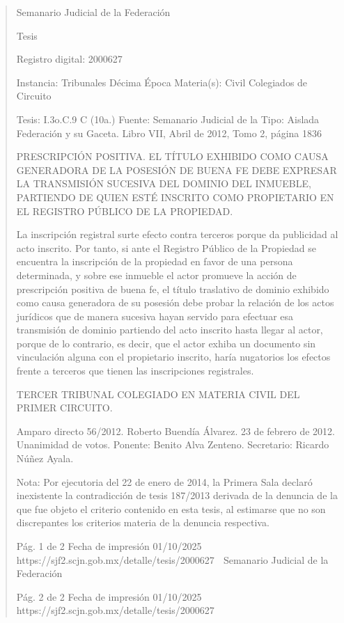 \documentclass[11pt,a4paper]{article}
\begin{document}
\begin{quote}
                                                   Semanario Judicial de la Federación

                                                 Tesis

 Registro digital: 2000627

 Instancia: Tribunales              Décima Época                           Materia(s): Civil
 Colegiados de Circuito

 Tesis: I.3o.C.9 C (10a.)           Fuente: Semanario Judicial de la       Tipo: Aislada
                                    Federación y su Gaceta.
                                    Libro VII, Abril de 2012, Tomo 2,
                                    página 1836


PRESCRIPCIÓN POSITIVA. EL TÍTULO EXHIBIDO COMO CAUSA GENERADORA DE LA
POSESIÓN DE BUENA FE DEBE EXPRESAR LA TRANSMISIÓN SUCESIVA DEL DOMINIO DEL
INMUEBLE, PARTIENDO DE QUIEN ESTÉ INSCRITO COMO PROPIETARIO EN EL REGISTRO
PÚBLICO DE LA PROPIEDAD.


La inscripción registral surte efecto contra terceros porque da publicidad al acto inscrito. Por tanto, si
ante el Registro Público de la Propiedad se encuentra la inscripción de la propiedad en favor de una
persona determinada, y sobre ese inmueble el actor promueve la acción de prescripción positiva de
buena fe, el título traslativo de dominio exhibido como causa generadora de su posesión debe
probar la relación de los actos jurídicos que de manera sucesiva hayan servido para efectuar esa
transmisión de dominio partiendo del acto inscrito hasta llegar al actor, porque de lo contrario, es
decir, que el actor exhiba un documento sin vinculación alguna con el propietario inscrito, haría
nugatorios los efectos frente a terceros que tienen las inscripciones registrales.

TERCER TRIBUNAL COLEGIADO EN MATERIA CIVIL DEL PRIMER CIRCUITO.


Amparo directo 56/2012. Roberto Buendía Álvarez. 23 de febrero de 2012. Unanimidad de votos.
Ponente: Benito Alva Zenteno. Secretario: Ricardo Núñez Ayala.

Nota: Por ejecutoria del 22 de enero de 2014, la Primera Sala declaró inexistente la contradicción de
tesis 187/2013 derivada de la denuncia de la que fue objeto el criterio contenido en esta tesis, al
estimarse que no son discrepantes los criterios materia de la denuncia respectiva.




                                               Pág. 1 de 2              Fecha de impresión 01/10/2025
  https://sjf2.scjn.gob.mx/detalle/tesis/2000627
                                                 Semanario Judicial de la Federación




                                            Pág. 2 de 2       Fecha de impresión 01/10/2025
https://sjf2.scjn.gob.mx/detalle/tesis/2000627

\end{quote}
\end{document}
